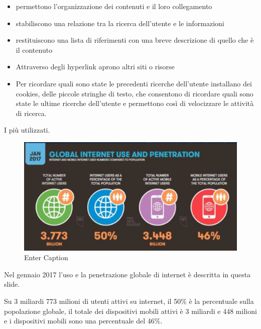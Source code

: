 \begin{itemize}
    \item permettono l'organizzazione dei contenuti e il loro collegamento
    \item stabiliscono una relazione tra la ricerca dell'utente e le informazioni
    \item restituiscono una lista di riferimenti con una breve descrizione di quello che è il contenuto
    \item Attraverso degli hyperlink aprono altri siti o risorse
    \item Per ricordare quali sono state le precedenti ricerche dell'utente installano dei cookies, delle piccole stringhe di testo, che consentono di ricordare quali sono state le ultime ricerche dell'utente e permettono così di velocizzare le attività di ricerca.
\end{itemize}

I più utilizzati.
\begin{figure}[ht]
    \centering
    \includegraphics[width=1\linewidth]{images/03_lez_fig_05.jpg}
    \caption{Enter Caption}
    \label{fig:enter-label}
\end{figure}

Nel gennaio 2017 l'uso e la penetrazione globale di internet è descritta in questa slide. \par
Su 3 miliardi 773 milioni di utenti attivi su internet, il 50\% è la percentuale sulla popolazione globale, il totale dei dispositivi mobili attivi è 3 miliardi e 448 milioni e i dispositivi mobili sono una percentuale del 46\%. \par

